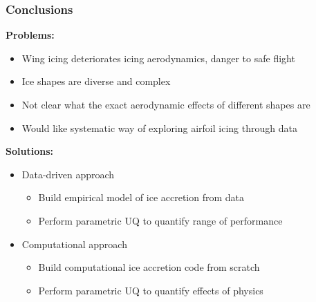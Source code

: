 \documentclass[9pt]{beamer}
\begin{document}
\begin{frame}
\frametitle{Conclusions}
\label{sec-3-10}

\textbf{Problems:}
\begin{itemize}
\item Wing icing deteriorates icing aerodynamics, danger to safe flight
\item Ice shapes are diverse and complex
\item Not clear what the exact aerodynamic effects of different shapes are
\item Would like systematic way of exploring airfoil icing through data
\end{itemize}
\textbf{Solutions:}
\begin{itemize}
\item Data-driven approach
\begin{itemize}
\item Build empirical model of ice accretion from data
\item Perform parametric UQ to quantify range of performance
\end{itemize}
\item Computational approach
\begin{itemize}
\item Build computational ice accretion code from scratch
\item Perform parametric UQ to quantify effects of physics
\end{itemize}
\end{itemize}







 
\end{frame}
\end{document}

